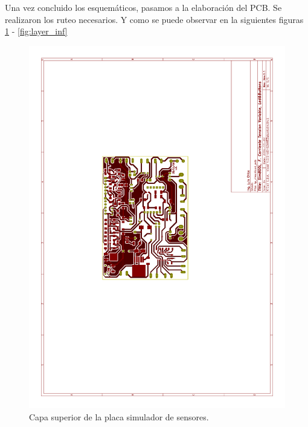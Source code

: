 Una vez concluido los esquemáticos, pasamos a la elaboración del PCB. Se realizaron los ruteo necesarios. Y como se puede observar en la siguientes figuras \ref{fig:layer_sup} - \ref{fig:layer_inf} 
\begin{figure}[h]
      \centering
      \includegraphics[page=1,scale=0.5,angle=270]{./Figures/pcb_layer.pdf}
      \caption{Capa superior de la placa simulador de sensores.}
      \label{fig:layer_sup}
\end{figure}
